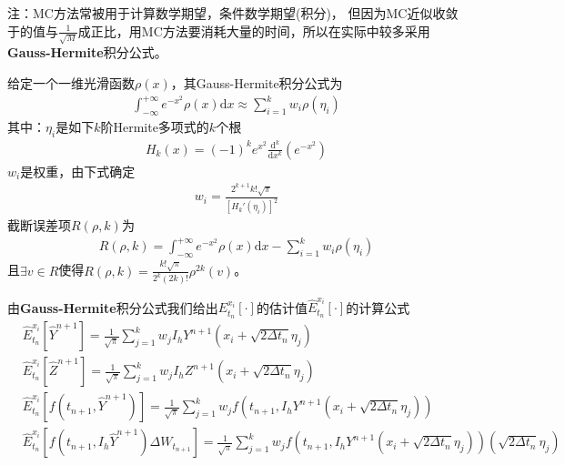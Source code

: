 			注：MC方法常被用于计算数学期望，条件数学期望(积分)， 但因为MC近似收敛于的值与$\frac {1}{\sqrt{M}}$成正比，用MC方法要消耗大量的时间，所以在实际中较多采用\textbf{Gauss-Hermite}积分公式。
			\par
			\begin{definition}
				 \par
				 给定一个一维光滑函数$\rho(x)$，其Gauss-Hermite积分公式为
				 \begin{align*}
				 \int_{ - \infty }^{ + \infty } {{e^{ - {x^2}}}\rho \left( x \right)\mathrm{d}x}  \approx \sum\limits_{i = 1}^k {{w_i}\rho \left( {{\eta_i}} \right)}
				 \end{align*}
				 其中：$\eta_i$是如下$k$阶Hermite多项式的$k$个根
				 \begin{align*}
				 {H_k}\left( x \right) = {\left( { - 1} \right)^k}{e^{{x^2}}}\frac{{{\mathrm{d}^k}}}{{\mathrm{d}{x^k}}}\left( {{e^{ - {x^2}}}} \right)
				 \end{align*}
				 $w_i$是权重，由下式确定
				 \begin{align*}
				 {w_i} = \frac{{{2^{k + 1}}k!\sqrt \pi  }}{{{{\left[ {H_k'\left( {{\eta _i}} \right)} \right]}^2}}}
				 \end{align*}
				截断误差项$R(\rho,k)$为\\
				\begin{align*}
				R\left( {\rho ,k} \right) = \int_{ - \infty }^{ + \infty } {{e^{ - {x^2}}}\rho \left( x \right)\mathrm{d}x}  - \sum\limits_{i = 1}^k {{w_i}\rho \left( {{\eta_i}} \right)}
				\end{align*}
				且$\exists v \in R$使得$R\left( {\rho ,k} \right) = \frac{{k!\sqrt \pi  }}{{{2^k}\left( {2k} \right)!}}{\rho ^{2k}}\left( v \right)$。
			\end{definition}
			\par
			由\textbf{Gauss-Hermite}积分公式我们给出$ E_{{t_n}}^{{x_i}}\left[ \cdot \right]$的估计值$\hat E_{{t_n}}^{{x_i}}\left[ \cdot \right]$的计算公式
			\begin{align*}
					&\hat E_{{t_n}}^{{x_i}}\left[ {{{\hat Y}^{n + 1}}} \right] = \frac{1}{{\sqrt \pi}}\sum\limits_{j = 1}^k {{w_j}{I_h}{Y^{n + 1}}\left( {{x_i} + \sqrt {2\Delta {t_n}}  {\eta _j}} \right)} \\
					&\hat E_{{t_n}}^{{x_i}}\left[ {{{\hat Z}^{n + 1}}} \right] = \frac{1}{{\sqrt \pi  }}\sum\limits_{j = 1}^k {{w_j}{I_h}{Z^{n + 1}}\left( {{x_i} + \sqrt {2\Delta {t_n}} {\eta _j}} \right)} \\
					&\hat E_{{t_n}}^{{x_i}}\left[ {f\left( {{t_{n + 1}},{{\hat Y}^{n + 1}}} \right)} \right] = \frac{1}{{\sqrt \pi  }}\sum\limits_{j = 1}^k {{w_j}f\left( {{t_{n + 1}},{I_h}{Y^{n + 1}}\left( {{x_i} + \sqrt {2\Delta {t_n}} {\eta _j}} \right)} \right)} \\
					&\hat E_{{t_n}}^{{x_i}}\left[ {f\left( {{t_{n + 1}},{I_h}{{\hat Y}^{n + 1}}} \right)\Delta {W_{{t_{n + 1}}}}} \right] = \frac{1}{{\sqrt \pi  }}\sum\limits_{j = 1}^k {{w_j}f\left( {{t_{n + 1}},{I_h}{Y^{n + 1}}\left( {{x_i} + \sqrt {2\Delta {t_n}} {\eta_j}} \right)} \right)} \left( {\sqrt {2\Delta {t_n}}   {\eta_j}} \right)
			\end{align*}
